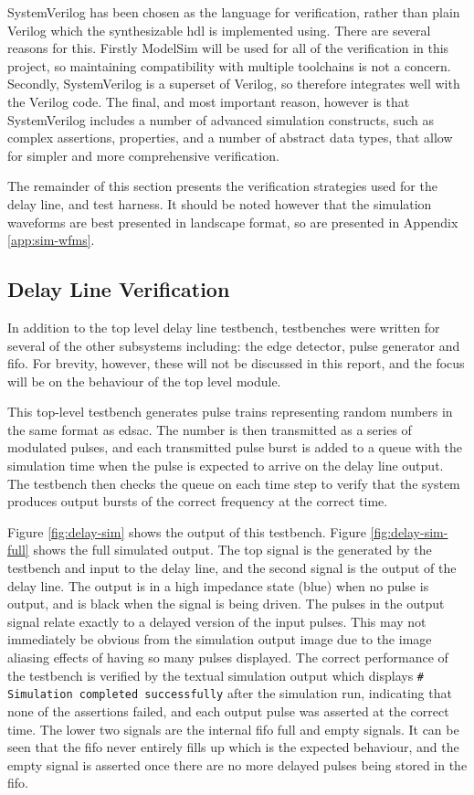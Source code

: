 SystemVerilog has been chosen as the language for verification, rather than plain Verilog which the synthesizable \gls{hdl} is implemented using. There are several reasons for this. Firstly ModelSim will be used for all of the verification in this project, so maintaining compatibility with multiple toolchains is not a concern. Secondly, SystemVerilog is a superset of Verilog, so therefore integrates well with the Verilog code. The final, and most important reason, however is that SystemVerilog includes a number of advanced simulation constructs, such as complex assertions, properties, and a number of abstract data types, that allow for simpler and more comprehensive verification.

The remainder of this section presents the verification strategies used for the delay line, and test harness. It should be noted however that the simulation waveforms are best presented in landscape format, so are presented in Appendix \ref{app:sim-wfms}.

\subsection{Delay Line Verification}

In addition to the top level delay line testbench, testbenches were written for several of the other subsystems including: the edge detector, pulse generator and \gls{fifo}. For brevity, however, these will not be discussed in this report, and the focus will be on the behaviour of the top level module.

This top-level testbench generates pulse trains representing random numbers in the same format as \gls{edsac}. The number is then transmitted as a series of modulated pulses, and each transmitted pulse burst is added to a queue with the simulation time when the pulse is expected to arrive on the delay line output. The testbench then checks the queue on each time step to verify that the system produces output bursts of the correct frequency at the correct time.
 
Figure \ref{fig:delay-sim} shows the output of this testbench. Figure \ref{fig:delay-sim-full} shows the full simulated output. The top signal is the generated by the testbench and input to the delay line, and the second signal is the output of the delay line. The output is in a high impedance state (blue) when no pulse is output, and is black when the signal is being driven. The pulses in the output signal relate exactly to a delayed version of the input pulses. This may not immediately be obvious from the simulation output image due to the image aliasing effects of having so many pulses displayed. The correct performance of the testbench is verified by the textual simulation output which displays \texttt{\# Simulation completed successfully} after the simulation run, indicating that none of the assertions failed, and each output pulse was asserted at the correct time. The lower two signals are the internal \gls{fifo} full and empty signals. It can be seen that the \gls{fifo} never entirely fills up which is the expected behaviour, and the empty signal is asserted once there are no more delayed pulses being stored in the \gls{fifo}.
 
